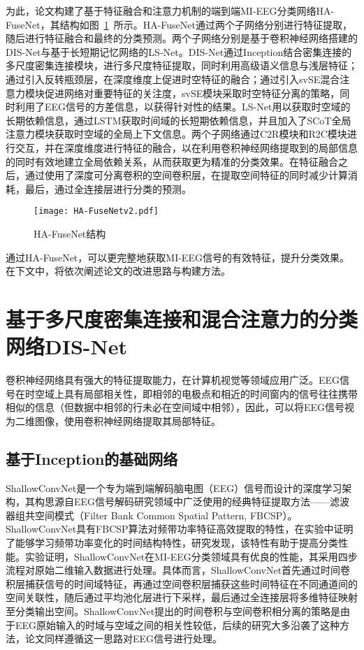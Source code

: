 为此，论文构建了基于特征融合和注意力机制的端到端MI-EEG分类网络HA-FuseNet，其结构如图~\ref{fig:hafuse}~所示。HA-FuseNet通过两个子网络分别进行特征提取，随后进行特征融合和最终的分类预测。两个子网络分别是基于卷积神经网络搭建的DIS-Net与基于长短期记忆网络的LS-Net。DIS-Net通过Inception结合密集连接的多尺度密集连接模块，进行多尺度特征提取，同时利用高级语义信息与浅层特征；通过引入反转瓶颈层，在深度维度上促进时空特征的融合；通过引入svSE混合注意力模块促进网络对重要特征的关注度，svSE模块采取时空特征分离的策略，同时利用了EEG信号的方差信息，以获得针对性的结果。LS-Net用以获取时空域的长期依赖信息，通过LSTM获取时间域的长短期依赖信息，并且加入了SCoT全局注意力模块获取时空域的全局上下文信息。两个子网络通过C2R模块和R2C模块进行交互，并在深度维度进行特征的融合，以在利用卷积神经网络提取到的局部信息的同时有效地建立全局依赖关系，从而获取更为精准的分类效果。在特征融合之后，通过使用了深度可分离卷积的空间卷积层，在提取空间特征的同时减少计算消耗，最后，通过全连接层进行分类的预测。
\begin{figure}
    \centering
    \texttt{[image: HA-FuseNetv2.pdf]}
    \caption{HA-FuseNet结构}
    \label{fig:hafuse}
  \end{figure}

通过HA-FuseNet，可以更完整地获取MI-EEG信号的有效特征，提升分类效果。在下文中，将依次阐述论文的改进思路与构建方法。

\section{基于多尺度密集连接和混合注意力的分类网络DIS-Net}

卷积神经网络具有强大的特征提取能力，在计算机视觉等领域应用广泛。EEG信号在时空域上具有局部相关性，即相邻的电极点和相近的时间窗内的信号往往携带相似的信息（但数据中相邻的行未必在空间域中相邻），因此，可以将EEG信号视为二维图像，使用卷积神经网络提取其局部特征。

\subsection{基于Inception的基础网络}

ShallowConvNet\cite{schirrmeister2017deep}是一个专为端到端解码脑电图（EEG）信号而设计的深度学习架构，其构思源自EEG信号解码研究领域中广泛使用的经典特征提取方法——滤波器组共空间模式（Filter Bank Common Spatial Pattern, FBCSP）\cite{ang2008filter}。ShallowConvNet具有FBCSP算法对频带功率特征高效提取的特性，在实验中证明了能够学习频带功率变化的时间结构特性\cite{schirrmeister2017deep}，研究发现，该特性有助于提高分类性能\cite{sakhavi2015parallel}。实验证明，ShallowConvNet在MI-EEG分类领域具有优良的性能\cite{lawhern2018eegnet}，其采用四步流程对原始二维输入数据进行处理。具体而言，ShallowConvNet首先通过时间卷积层捕获信号的时间域特征，再通过空间卷积层捕获这些时间特征在不同通道间的空间关联性，随后通过平均池化层进行下采样，最后通过全连接层将多维特征映射至分类输出空间。ShallowConvNet提出的时间卷积与空间卷积相分离的策略是由于EEG原始输入的时域与空域之间的相关性较低，后续的研究大多沿袭了这种方法，论文同样遵循这一思路对EEG信号进行处理。

